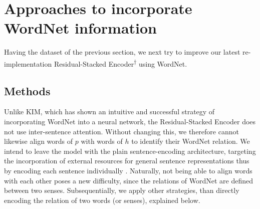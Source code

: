 \section{Approaches to incorporate WordNet information}
Having the dataset of the previous section, we next try to improve our latest re-implementation Residual-Stacked Encoder\textsuperscript{$\dagger$} using WordNet. 
\subsection{Methods}
Unlike \ac{KIM}, which has shown an intuitive and successful strategy of incorporating WordNet into a neural network, the Residual-Stacked Encoder does not use inter-sentence attention. Without changing this, we therefore cannot likewise align words of $p$ with words of $h$ to identify their WordNet relation. We intend to leave the model with the plain sentence-encoding architecture, targeting the incorporation of external resources for general sentence representations thus by encoding each sentence individually \citep{nangia2017repeval}. Naturally, not being able to align words with each other poses a new difficulty, since the relations of WordNet are defined between two senses. Subsequentially, we apply other strategies, than directly encoding the relation of two words (or senses), explained below.
